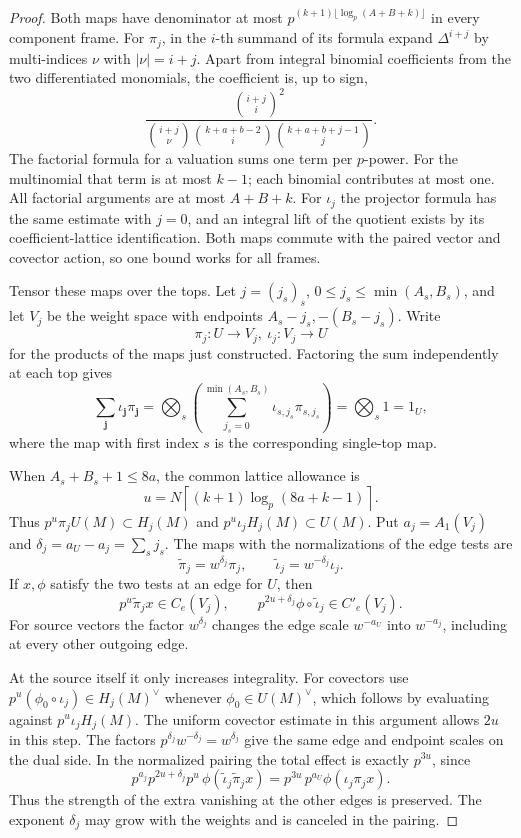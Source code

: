 \begin{proof}
Both maps have denominator at most
\(p^{(k+1)\lfloor\log_p(A+B+k)\rfloor}\) in every component
frame. For \(\pi_j\), in the \(i\)-th summand of its formula
expand \(\Delta^{i+j}\) by multi-indices \(\nu\) with
\(|\nu|=i+j\). Apart from integral binomial coefficients
from the two differentiated monomials, the coefficient is,
up to sign,
\[
 \frac{\binom{i+j}{i}^2}
 {\binom{i+j}{\nu}\binom{k+a+b-2}{i}\binom{k+a+b+j-1}{j}}.
\]
The factorial formula for a valuation sums one term per \(p\)-power.
For the multinomial that term is at most \(k-1\); each binomial
contributes at most one. All factorial arguments are at most
\(A+B+k\). For \(\iota_j\) the projector formula has the same
estimate with \(j=0\), and an integral lift of the quotient
exists by its coefficient-lattice identification. Both maps
commute with the paired vector and covector action, so one
bound works for all frames.

Tensor these maps over the tops. Let \(j=(j_s)_s\),
\(0\le j_s\le\min(A_s,B_s)\), and let \(V_j\) be the weight
space with endpoints \(A_s-j_s,-(B_s-j_s)\). Write
\[
 \pi_j:U\to V_j,\ \iota_j:V_j\to U
\]
for the products of
the maps just constructed. Factoring the sum independently at each top gives
\[
 \sum_{\mathbf j}\iota_{\mathbf j}\pi_{\mathbf j}
 =\bigotimes_s\left(\sum_{j_s=0}^{\min(A_s,B_s)}
        \iota_{s,j_s}\pi_{s,j_s}\right)
 =\bigotimes_s 1=1_U ,
\]
where the map with first index \(s\) is the corresponding single-top
map.

When \(A_s+B_s+1\le8a\), the common lattice allowance is
\[
 u=N\left\lceil (k+1)\log_p(8a+k-1)\right\rceil.
\]
Thus \(p^u\pi_j U(M)\subset H_j(M)\) and
\(p^u\iota_j H_j(M)\subset U(M)\). Put \(a_j=A_1(V_j)\)
and \(\delta_j=a_U-a_j=\sum_s j_s\).
The maps with the normalizations of the edge tests are
\[
 \widetilde\pi_j=w^{\delta_j}\pi_j,\qquad
 \widetilde\iota_j=w^{-\delta_j}\iota_j .
\]
If \(x,\phi\) satisfy the two tests at an edge for \(U\), then
\begin{equation}\label{eq:edge-test-maps}
 p^u\widetilde\pi_j x\in C_e(V_j),\qquad
 p^{2u+\delta_j}\phi\circ\widetilde\iota_j\in C'_e(V_j).
\end{equation}
For source vectors the factor \(w^{\delta_j}\) changes the
edge scale \(w^{-a_U}\) into \(w^{-a_j}\), including at every
other outgoing edge.

At the source itself it only increases
integrality. For covectors use
\(p^u(\phi_0\circ\iota_j)\in H_j(M)^\vee\) whenever
\(\phi_0\in U(M)^\vee\), which follows by evaluating against
\(p^u\iota_j H_j(M)\). The uniform covector estimate in this argument allows
\(2u\) in this step. The factors
\(p^{\delta_j}w^{-\delta_j}=w^{\delta_j}\) give the same
edge and endpoint scales on the dual side. In the normalized
pairing the total effect is exactly \(p^{3u}\), since
\[
 p^{a_j}p^{2u+\delta_j}p^u\,
 \phi(\widetilde\iota_j\widetilde\pi_j x)
       =p^{3u}\,p^{a_U}\phi(\iota_j\pi_j x).
\]
Thus the strength of the extra vanishing at the other edges
is preserved. The exponent \(\delta_j\) may grow with the
weights and is canceled in the pairing.


\end{proof}
